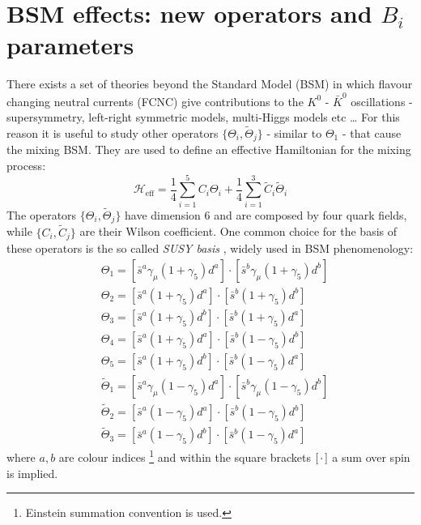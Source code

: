 \documentclass[english, LaM, oneside, noexaminfo]{sapthesis}
\newcommand{\kkb}{$K^0$ - $\bar K^0$ }
\begin{document}
\section{BSM effects: new operators and $B_i$ parameters}
\noindent
There exists a set of theories beyond the Standard Model (BSM) in which flavour changing neutral currents (FCNC) give contributions to the \kkb oscillations - supersymmetry, left-right symmetric models, multi-Higgs models etc \dots
For this reason it is useful to study other operators $\{\Theta_i,\tilde\Theta_j\}$ - similar to $\Theta_1$ - that cause the mixing BSM.
They are used to define an effective Hamiltonian for the mixing process:
\begin{equation*}
    \mathcal{H}_\text{eff} = \frac{1}{4} \sum_{i = 1}^5 C_i \Theta_i + \frac{1}{4} \sum_{i = 1}^3 \tilde C_i \tilde \Theta_i
\end{equation*}
The operators $\{\Theta_i,\tilde\Theta_j\}$ have dimension 6 and are composed by four quark fields, while $\{C_i,\tilde C_j\}$ are their Wilson coefficient.
One common choice for the basis of these operators is the so called \textit{SUSY basis} \cite{Bparameters}, widely used in BSM phenomenology:
\begin{equation}\label{eq:Thetai-operators}
    \begin{aligned}
       & \Theta_1 = [\bar s^a \gamma_\mu (1+\gamma_5) d^a] \cdot [ \bar s^b \gamma_\mu (1+\gamma_5) d^b ] \\
       & \Theta_2 = [\bar s^a  (1+\gamma_5) d^a ] \cdot [ \bar s^b (1+\gamma_5) d^b ] \\
       & \Theta_3 = [\bar s^a  (1+\gamma_5) d^b ] \cdot [ \bar s^b (1+\gamma_5) d^a ] \\
       & \Theta_4 = [\bar s^a  (1+\gamma_5) d^a ] \cdot [ \bar s^b (1-\gamma_5) d^b ] \\
       & \Theta_5 = [\bar s^a  (1+\gamma_5) d^b ] \cdot [ \bar s^b (1-\gamma_5) d^a ] \\
       & \tilde\Theta_1 = [\bar s^a \gamma_\mu (1-\gamma_5) d^a] \cdot [ \bar s^b \gamma_\mu (1-\gamma_5) d^b ] \\
       & \tilde\Theta_2 = [\bar s^a  (1-\gamma_5) d^a] \cdot [ \bar s^b (1-\gamma_5) d^b ] \\
       & \tilde\Theta_3 = [\bar s^a  (1-\gamma_5) d^b] \cdot [ \bar s^b (1-\gamma_5) d^a ]
    \end{aligned}
\end{equation}
where $a,b$ are colour indices \footnote{Einstein summation convention is used.} and within the square brackets $[\hspace*{0.5mm}\cdot\hspace*{0.5mm}]$ a sum over spin is implied.
\end{document}
